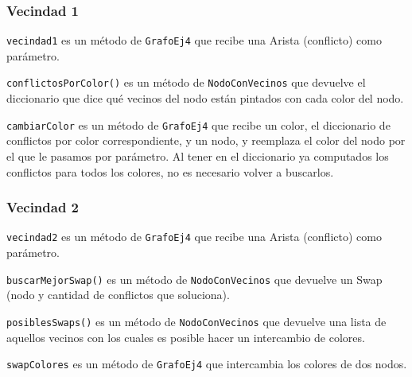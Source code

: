 \subsubsection{Vecindad 1}

\texttt{vecindad1} es un método de \texttt{GrafoEj4} que recibe una Arista (conflicto) como parámetro.



\texttt{conflictosPorColor()} es un método de \texttt{NodoConVecinos} que devuelve el diccionario que dice qué vecinos del nodo están pintados con cada color del nodo.



\texttt{cambiarColor} es un método de \texttt{GrafoEj4} que recibe un color, el diccionario de conflictos por color correspondiente, y un nodo, y reemplaza el color del nodo por el que le pasamos por parámetro. Al tener en el diccionario ya computados los conflictos para todos los colores, no es necesario volver a buscarlos.



\subsubsection{Vecindad 2}

\texttt{vecindad2} es un método de \texttt{GrafoEj4} que recibe una Arista (conflicto) como parámetro.



\texttt{buscarMejorSwap()} es un método de \texttt{NodoConVecinos} que devuelve un Swap (nodo y cantidad de conflictos que soluciona).



\texttt{posiblesSwaps()} es un método de \texttt{NodoConVecinos} que devuelve una lista de aquellos vecinos con los cuales es posible hacer un intercambio de colores.



\texttt{swapColores} es un método de \texttt{GrafoEj4} que intercambia los colores de dos nodos.

